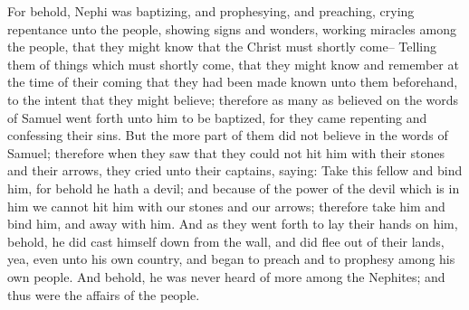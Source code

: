 For behold, Nephi was baptizing, and prophesying, and preaching, crying repentance unto the people, showing signs and wonders, working miracles among the people, that they might know that the Christ must shortly come--
\bverse \iffalse Telling them of things which must shortly come, that they might know and remember at the time of their coming that they had been made known unto them beforehand, to the intent that they might believe; therefore as many as believed on the words of Samuel went forth unto him to be baptized, for they came repenting and confessing their sins. \fi
Telling them of things which must shortly come, that they might know and remember at the time of their coming that they had been made known unto them beforehand, to the intent that they might believe; therefore as many as believed on the words of Samuel went forth unto him to be baptized, for they came repenting and confessing their sins.
\bverse \iffalse But the more part of them did not believe in the words of Samuel; therefore when they saw that they could not hit him with their stones and their arrows, they cried unto their captains, saying: Take this fellow and bind him, for behold he hath a devil; and because of the power of the devil which is in him we cannot hit him with our stones and our arrows; therefore take him and bind him, and away with him. \fi
But the more part of them did not believe in the words of Samuel; therefore when they saw that they could not hit him with their stones and their arrows, they cried unto their captains, saying: Take this fellow and bind him, for behold he hath a devil; and because of the power of the devil which is in him we cannot hit him with our stones and our arrows; therefore take him and bind him, and away with him.
\bverse \iffalse And as they went forth to lay their hands on him, behold, he did cast himself down from the wall, and did flee out of their lands, yea, even unto his own country, and began to preach and to prophesy among his own people. \fi
And as they went forth to lay their hands on him, behold, he did cast himself down from the wall, and did flee out of their lands, yea, even unto his own country, and began to preach and to prophesy among his own people.
\bverse \iffalse And behold, he was never heard of more among the Nephites; and thus were the affairs of the people. \fi
And behold, he was never heard of more among the Nephites; and thus were the affairs of the people.
\bverse \iffalse And thus ended the eighty and sixth year of the reign of the judges over the people of Nephi. \fi
